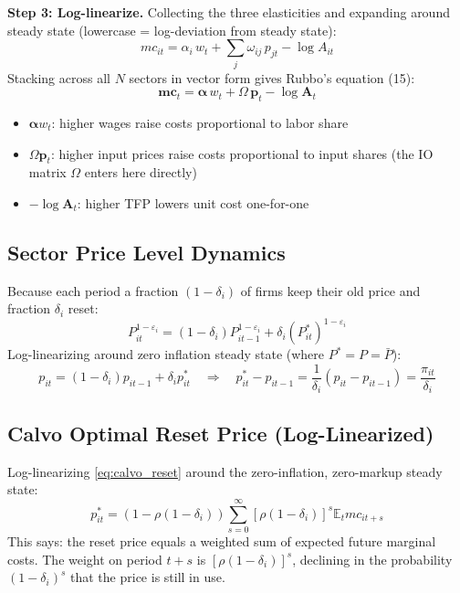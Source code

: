 \documentclass[12pt]{article}
\begin{document}
\textbf{Step 3: Log-linearize.} Collecting the three elasticities and expanding around steady state (lowercase = log-deviation from steady state):
\begin{equation}
    mc_{it} = \alpha_i\, w_t + \sum_j \omega_{ij}\, p_{jt} - \log A_{it}
\end{equation}
Stacking across all $N$ sectors in vector form gives Rubbo's equation (15):
\begin{equation}
    \bm{mc}_t = \bm{\alpha}\, w_t + \Omega\, \bm{p}_t - \log \mathbf{A}_t
    \label{eq:mc}
\end{equation}
\begin{itemize}
    \item $\bm{\alpha} w_t$: higher wages raise costs proportional to labor share
    \item $\Omega \bm{p}_t$: higher input prices raise costs proportional to input shares (the IO matrix $\Omega$ enters here directly)
    \item $-\log \mathbf{A}_t$: higher TFP lowers unit cost one-for-one
\end{itemize}

\subsection{Sector Price Level Dynamics}

Because each period a fraction $(1-\delta_i)$ of firms keep their old price and fraction $\delta_i$ reset:
\begin{equation}
    P_{it}^{1-\varepsilon_i} = (1-\delta_i) P_{it-1}^{1-\varepsilon_i} + \delta_i (P_{it}^*)^{1-\varepsilon_i}
\end{equation}
Log-linearizing around zero inflation steady state (where $P^* = P = \bar{P}$):
\begin{equation}
    p_{it} = (1-\delta_i) p_{it-1} + \delta_i p_{it}^*
    \quad \Rightarrow \quad
    p_{it}^* - p_{it-1} = \frac{1}{\delta_i}(p_{it} - p_{it-1}) = \frac{\pi_{it}}{\delta_i}
    \label{eq:price_law}
\end{equation}

\subsection{Calvo Optimal Reset Price (Log-Linearized)}

Log-linearizing \eqref{eq:calvo_reset} around the zero-inflation, zero-markup steady state:
\begin{equation}
    p_{it}^* = (1-\rho(1-\delta_i))\sum_{s=0}^\infty [\rho(1-\delta_i)]^s \mathbb{E}_t mc_{it+s}
    \label{eq:pstar}
\end{equation}
This says: the reset price equals a weighted sum of expected future marginal costs. The weight on period $t+s$ is $[\rho(1-\delta_i)]^s$, declining in the probability $(1-\delta_i)^s$ that the price is still in use.
\end{document}
